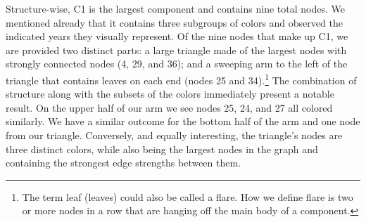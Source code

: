 \documentclass[
  10pt,
  letterpaper,
  DIV=11,
  numbers=noendperiod]{scrartcl}
\begin{document}
Structure-wise, C1 is the largest component and contains nine total
nodes. We mentioned already that it contains three subgroups of colors
and observed the indicated years they visually represent. Of the nine
nodes that make up C1, we are provided two distinct parts: a large
triangle made of the largest nodes with strongly connected nodes (4, 29,
and 36); and a sweeping arm to the left of the triangle that contains
leaves on each end (nodes 25 and
34).\footnote{The term leaf (leaves) could also be called a flare. How we define flare is two or more nodes in a row that are hanging off the main body of a component.}
The combination of structure along with the subsets of the colors
immediately present a notable result. On the upper half of our arm we
see nodes 25, 24, and 27 all colored similarly. We have a similar
outcome for the bottom half of the arm and one node from our triangle.
Conversely, and equally interesting, the triangle's nodes are three
distinct colors, while also being the largest nodes in the graph and
containing the strongest edge strengths between them.
\end{document}
